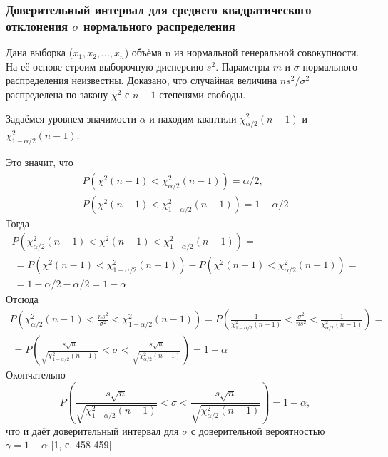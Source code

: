 \documentclass[12pt]{article}
\begin{document}
	\subsubsection{Доверительный интервал для среднего квадратического отклонения $\sigma$ нормального распределения}
	Дана выборка ($x_{1},x_{2}, ... ,x_{n}$) объёма n из нормальной генеральной совокупности. На её основе строим выборочную дисперсию $s^{2}$. Параметры $m$ и $\sigma$ нормального распределения неизвестны. Доказано, что случайная величина $ns^{2}/\sigma^{2}$ распределена по закону $\chi^{2}$ с $n-1$ степенями свободы.

	Задаёмся уровнем значимости $\alpha$ и находим квантили $\chi^{2}_{\alpha/2}(n-1)$ и $\chi^{2}_{1-\alpha/2}(n-1)$.

	Это значит, что 
	\begin{equation}
		\begin{split}
			P\left(\chi^{2}(n-1) < \chi^{2}_{\alpha/2}(n-1)\right) = \alpha/2, \\
			P\left(\chi^{2}(n-1) < \chi^{2}_{1-\alpha/2}(n-1)\right) = 1-\alpha/2
		\end{split}
		\label{P_chi_2x2}        
	\end{equation}
	Тогда
	\begin{multline}
		P\left(\chi^{2}_{\alpha/2}(n-1) < \chi^{2}(n-1) < \chi^{2}_{1-\alpha/2}(n-1)\right) = \\\ =
		P\left(\chi^{2}(n-1) < \chi^{2}_{1-\alpha/2}(n-1)\right) -P\left(\chi^{2}(n-1) < \chi^{2}_{\alpha/2}(n-1)\right) = \\\ = 1 - \alpha/2 -\alpha/2 = 1 - \alpha
		\label{P_chi_2}
	\end{multline}
	Отсюда
	\begin{multline}
		P\left(\chi^{2}_{\alpha/2}(n-1) < \frac{ns^{2}}{\sigma^{2}} < \chi^{2}_{1-\alpha/2}(n-1)\right) =
		P\left(\frac{1}{\chi^{2}_{1-\alpha/2}(n-1)} < \frac{\sigma^{2}}{ns^{2}} < \frac{1}{\chi^{2}_{\alpha/2}(n-1)} \right) = \\\ =
		P\left(\frac{s\sqrt{n}}{\sqrt{\chi^{2}_{1-\alpha/2}(n-1)}} < \sigma <  \frac{s\sqrt{n}}{\sqrt{\chi^{2}_{\alpha/2}(n-1)}}\right) = 1- \alpha
		\label{interv}
	\end{multline}
	Окончательно
	\begin{equation}
		P\left(\frac{s\sqrt{n}}{\sqrt{\chi^{2}_{1-\alpha/2}(n-1)}} < \sigma <  \frac{s\sqrt{n}}{\sqrt{\chi^{2}_{\alpha/2}(n-1)}}\right) = 1- \alpha,
		\label{fin_interval}
	\end{equation}
	что и даёт доверительный интервал для $\sigma$ с доверительной вероятностью $\gamma = 1 - \alpha$ [1, с. 458-459].
	
\end{document}
